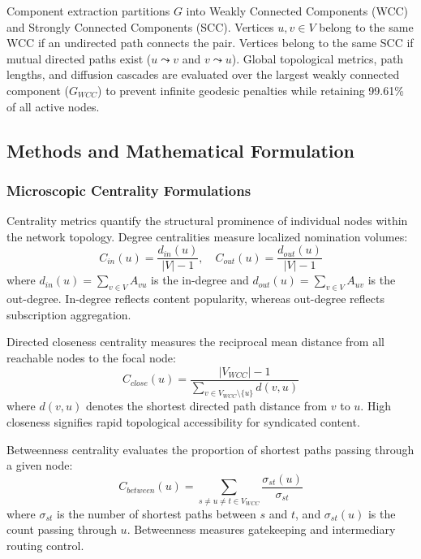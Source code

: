 \documentclass[conference]{IEEEtran}
\begin{document}
Component extraction partitions $G$ into Weakly Connected Components (WCC) and Strongly Connected Components (SCC). Vertices $u, v \in V$ belong to the same WCC if an undirected path connects the pair. Vertices belong to the same SCC if mutual directed paths exist ($u \leadsto v$ and $v \leadsto u$). Global topological metrics, path lengths, and diffusion cascades are evaluated over the largest weakly connected component ($G_{WCC}$) to prevent infinite geodesic penalties while retaining 99.61\% of all active nodes.

\subsection{Methods and Mathematical Formulation}

\subsubsection{Microscopic Centrality Formulations}
Centrality metrics quantify the structural prominence of individual nodes within the network topology. Degree centralities measure localized nomination volumes:
\begin{equation}
    C_{in}(u) = \frac{d_{in}(u)}{|V| - 1}, \quad C_{out}(u) = \frac{d_{out}(u)}{|V| - 1}
    \label{eq:degree}
\end{equation}
where $d_{in}(u) = \sum_{v \in V} A_{vu}$ is the in-degree and $d_{out}(u) = \sum_{v \in V} A_{uv}$ is the out-degree. In-degree reflects content popularity, whereas out-degree reflects subscription aggregation.

Directed closeness centrality measures the reciprocal mean distance from all reachable nodes to the focal node:
\begin{equation}
    C_{close}(u) = \frac{|V_{WCC}| - 1}{\sum_{v \in V_{WCC} \setminus \{u\}} d(v, u)}
    \label{eq:closeness}
\end{equation}
where $d(v, u)$ denotes the shortest directed path distance from $v$ to $u$. High closeness signifies rapid topological accessibility for syndicated content.

Betweenness centrality evaluates the proportion of shortest paths passing through a given node:
\begin{equation}
    C_{between}(u) = \sum_{s \ne u \ne t \in V_{WCC}} \frac{\sigma_{st}(u)}{\sigma_{st}}
    \label{eq:betweenness}
\end{equation}
where $\sigma_{st}$ is the number of shortest paths between $s$ and $t$, and $\sigma_{st}(u)$ is the count passing through $u$. Betweenness measures gatekeeping and intermediary routing control.
\end{document}
